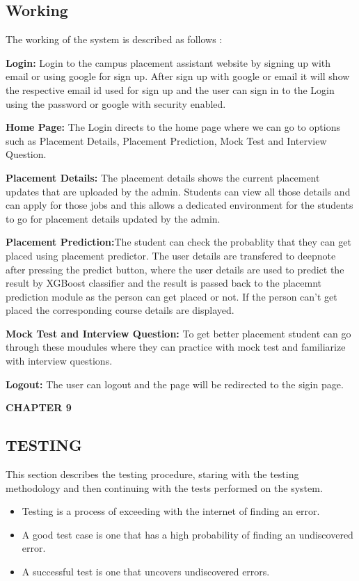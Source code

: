 \documentclass[12pt]{article}
\begin{document}
\subsection{Working}
The working of the system is described as follows :
\begin{steps}
  \item \textbf{Login:} Login to the campus placement assistant website by signing up with email or using google for sign up. After sign up with google or email it will show the respective email id used for sign up and the user can sign in to the Login using the password or google with security enabled.
  \item \textbf{Home Page:} The Login directs to the home page where we can go to options such as Placement Details, Placement Prediction, Mock Test and Interview Question.
\item \textbf{Placement Details:} The placement details shows the current placement updates that are uploaded by the admin. Students can view all those details and can apply for those jobs and this allows a dedicated environment for the students to go for placement details updated by the admin.
\item \textbf{Placement Prediction:}The student can check the probablity that they can get placed using placement predictor. The user details are transfered to deepnote after pressing the predict button, where the user details are used to predict the result by XGBoost classifier and the result is passed back to the placemnt prediction module as the person can get placed or not. If the person can't get placed the corresponding course details are displayed.
\item \textbf{Mock Test and Interview Question:} To get better placement student can go through these moudules where they can practice with mock test and familiarize with interview questions.
\item \textbf{Logout:} The user can logout and the page will be redirected to the sigin page.
\end{steps}

\newpage
\begin{flushleft}\textbf{CHAPTER 9} \end{flushleft}
\begin{flushleft}\section{TESTING} \end{flushleft}
\vspace*{10px}
This section describes the testing procedure, staring with the testing methodology
and then continuing with the tests performed on the system.
\begin{itemize}
\item Testing is a process of exceeding with the internet of finding an error.
\item A good test case is one that has a high probability of finding an undiscovered error.
\item A successful test is one that uncovers undiscovered errors.
\end{itemize}
\end{document}
